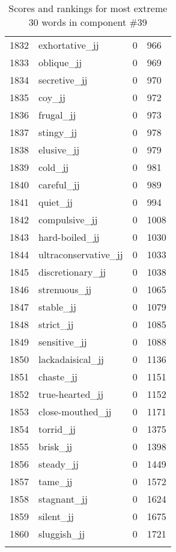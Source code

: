 \begin{longtable}[!htbp]{| rlr@{.}l |}
    1832 & exhortative\_jj & 0 & 966 \\
    1833 & oblique\_jj & 0 & 969 \\
    1834 & secretive\_jj & 0 & 970 \\
    1835 & coy\_jj & 0 & 972 \\
    1836 & frugal\_jj & 0 & 973 \\
    1837 & stingy\_jj & 0 & 978 \\
    1838 & elusive\_jj & 0 & 979 \\
    1839 & cold\_jj & 0 & 981 \\
    1840 & careful\_jj & 0 & 989 \\
    1841 & quiet\_jj & 0 & 994 \\
    1842 & compulsive\_jj & 0 & 1008 \\
    1843 & hard-boiled\_jj & 0 & 1030 \\
    1844 & ultraconservative\_jj & 0 & 1033 \\
    1845 & discretionary\_jj & 0 & 1038 \\
    1846 & strenuous\_jj & 0 & 1065 \\
    1847 & stable\_jj & 0 & 1079 \\
    1848 & strict\_jj & 0 & 1085 \\
    1849 & sensitive\_jj & 0 & 1088 \\
    1850 & lackadaisical\_jj & 0 & 1136 \\
    1851 & chaste\_jj & 0 & 1151 \\
    1852 & true-hearted\_jj & 0 & 1152 \\
    1853 & close-mouthed\_jj & 0 & 1171 \\
    1854 & torrid\_jj & 0 & 1375 \\
    1855 & brisk\_jj & 0 & 1398 \\
    1856 & steady\_jj & 0 & 1449 \\
    1857 & tame\_jj & 0 & 1572 \\
    1858 & stagnant\_jj & 0 & 1624 \\
    1859 & silent\_jj & 0 & 1675 \\
    1860 & sluggish\_jj & 0 & 1721 \\
    \hline
    \caption{Scores and rankings for most extreme 30 words in component \#39} \\
\end{longtable}
